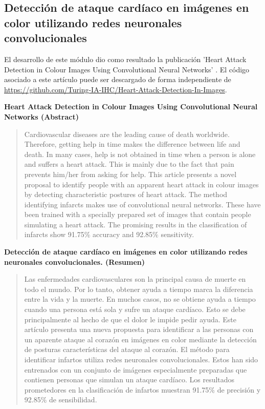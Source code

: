     \subsection{Detección de ataque cardíaco en imágenes en color utilizando redes neuronales convolucionales}
    \label{sub:InfarctColorMethod}
    
        El desarrollo de este módulo dio como resultado la publicación 'Heart Attack Detection in Colour Images Using Convolutional Neural Networks' \cite{rojas2019heart}. El código asociado a este artículo puede ser descargado de forma independiente de \url{https://github.com/Turing-IA-IHC/Heart-Attack-Detection-In-Images}.
        
        \textbf{Heart Attack Detection in Colour Images Using Convolutional Neural Networks (Abstract)}
        \begin{quote}
        Cardiovascular diseases are the leading cause of death worldwide. Therefore, getting help in time makes the difference between life and death. In many cases, help is not obtained in time when a person is alone and suffers a heart attack. This is mainly due to the fact that pain prevents him/her from asking for help. This article presents a novel proposal to identify people with an apparent heart attack in colour images by detecting characteristic postures of heart attack. The method identifying infarcts makes use of convolutional neural networks. These have been trained with a specially prepared set of images that contain people simulating a heart attack. The promising results in the classification of infarcts show 91.75\% accuracy and 92.85\% sensitivity.
        \end{quote}
        \textbf{Detección de ataque cardíaco en imágenes en color utilizando redes neuronales convolucionales. (Resumen)}
        \begin{quote}
        Las enfermedades cardiovasculares son la principal causa de muerte en todo el mundo. Por lo tanto, obtener ayuda a tiempo marca la diferencia entre la vida y la muerte. En muchos casos, no se obtiene ayuda a tiempo cuando una persona está sola y sufre un ataque cardíaco. Esto se debe principalmente al hecho de que el dolor le impide pedir ayuda. Este artículo presenta una nueva propuesta para identificar a las personas con un aparente ataque al corazón en imágenes en color mediante la detección de posturas características del ataque al corazón. El método para identificar infartos utiliza redes neuronales convolucionales. Estos han sido entrenados con un conjunto de imágenes especialmente preparadas que contienen personas que simulan un ataque cardíaco. Los resultados prometedores en la clasificación de infartos muestran 91.75\% de precisión y 92.85\% de sensibilidad.
        \end{quote}
        
